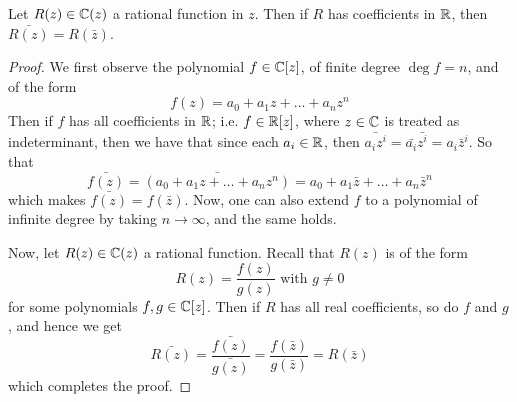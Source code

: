\begin{lemma}\label{1.1.6}
    Let $R(z) \in \mathbb{C}(z)$ a rational function in $z$. Then if  $R$ has
    coefficients in $\mathbb{R}$, then $\bar{R(z)}=R(\bar{z})$.
\end{lemma}
\begin{proof}
    We first observe the polynomial $f \in \mathbb{C}[z]$, of finite degree $\deg{f}=n$,
    and of the form
    \begin{equation*}
        f(z)=a_0+a_1z+\dots+a_nz^n
    \end{equation*}
    Then if $f$ has all coefficients in $\mathbb{R}$; i.e. $f \in \mathbb{R}[z]$, where $z \in
    \mathbb{C}$ is treated as indeterminant, then we have that since each  $a_i \in \mathbb{R}$,
    then  $\bar{a_iz^i}=\bar{a_i}\bar{z^i}=a_i\bar{z}^i$. So that
    \begin{equation*}
        \bar{f(z)}=\bar{(a_0+a_1z+\dots+a_nz^n)}=a_0+a_1\bar{z}+\dots+a_n\bar{z}^n
    \end{equation*}
    which makes $\bar{f(z)}=f(\bar{z})$. Now, one can also extend $f$ to a
    polynomial of infinite degree by taking $n \xrightarrow{} \infty$, and the
    same holds.

    Now, let $R(z) \in \mathbb{C}(z)$ a rational function. Recall that $R(z)$ is of the
    form
    \begin{equation*}
        R(z)=\frac{f(z)}{g(z)} \text{ with } g \neq 0
    \end{equation*}
    for some polynomials $f,g \in \mathbb{C}[z]$. Then if $R$ has all real
    coefficients, so do  $f$ and  $g$, and hence we get
    \begin{equation*}
        \bar{R(z)}=\frac{\bar{f(z)}}{\bar{g(z)}}=\frac{f(\bar{z})}{g(\bar{z})}=R(\bar{z})
    \end{equation*}
    which completes the proof.
\end{proof}

